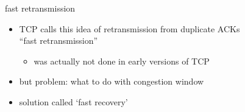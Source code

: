 \begin{frame}{fast retransmission}
    \begin{itemize}
    \item TCP calls this idea of retransmission from duplicate ACKs  \\
        ``fast retransmission''
        \begin{itemize}
        \item was actually not done in early versions of TCP
        \end{itemize}
    \vspace{.5cm}
    \item but problem: what to do with congestion window
    \item solution called `fast recovery'
    \end{itemize}
\end{frame}
